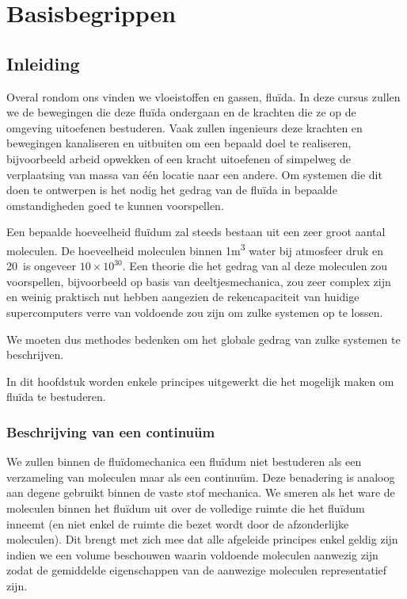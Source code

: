 \chapter{Basisbegrippen}
\label{sec:Basisbegrippen}

	\section{Inleiding}
	\label{sec:Basisbegrippen Inleiding}
Overal rondom ons vinden we vloeistoffen en gassen, fluïda. In deze cursus zullen we de bewegingen die deze fluïda ondergaan en de krachten die ze op de omgeving uitoefenen bestuderen. Vaak zullen ingenieurs deze krachten en bewegingen kanaliseren en uitbuiten om een bepaald doel te realiseren, bijvoorbeeld arbeid opwekken of een kracht uitoefenen of simpelweg de verplaatsing van massa van één locatie naar een andere. Om systemen die dit doen te ontwerpen is het nodig het gedrag van de fluïda in bepaalde omstandigheden goed te kunnen voorspellen.

Een bepaalde hoeveelheid fluïdum zal steeds bestaan uit een zeer groot aantal moleculen. De hoeveelheid moleculen binnen 1\unit{m^3} water bij atmosfeer druk en 20\degC\ is ongeveer $10\times10^{30}$. Een theorie die het gedrag van al deze moleculen zou voorspellen, bijvoorbeeld op basis van deeltjesmechanica, zou zeer complex zijn en weinig praktisch nut hebben aangezien de rekencapaciteit van huidige supercomputers verre van voldoende zou zijn om zulke systemen op te lossen.

We moeten dus methodes bedenken om het globale gedrag van zulke systemen te beschrijven.

In dit hoofdstuk worden enkele principes uitgewerkt die het mogelijk maken om fluïda te bestuderen.
	
	\subsection{Beschrijving van een continuüm}
	\label{sec:Beschrijving van een continuum}	
We zullen binnen de fluïdomechanica een fluïdum niet bestuderen als een verzameling van moleculen maar als een continuüm. Deze benadering is analoog aan degene gebruikt binnen de vaste stof mechanica. We smeren als het ware de moleculen binnen het fluïdum uit over de volledige ruimte die het fluïdum inneemt (en niet enkel de ruimte die bezet wordt door de afzonderlijke moleculen). Dit brengt met zich mee dat alle afgeleide principes enkel geldig zijn indien we een volume beschouwen waarin voldoende moleculen aanwezig zijn zodat de gemiddelde eigenschappen van de aanwezige moleculen representatief zijn.

